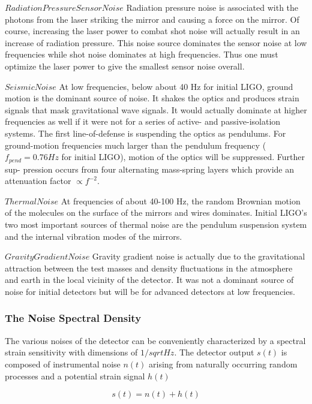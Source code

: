 \documentclass[binding=0.6cm, LaM]{sapthesis}
\begin{document}
	$Radiation Pressure Sensor Noise$
	Radiation pressure noise is associated with the photons from the laser striking the mirror 
	and causing a force on the mirror. Of course, increasing the laser power to combat shot noise 
	will actually result in an increase of radiation pressure. 
	This noise source dominates the sensor noise at low frequencies while shot noise dominates 
	at high frequencies. Thus one must optimize the laser power to give the smallest sensor noise overall.

	$Seismic Noise$
	At low frequencies, below about 40 Hz for initial LIGO, ground motion is the dominant
	source of noise. It shakes the optics and produces strain signals that mask gravitational wave
	signals. It would actually dominate at higher frequencies as well if it were not for a series
	of active- and passive-isolation systems. The first line-of-defense is suspending the optics
	as pendulums. For ground-motion frequencies much larger than the pendulum frequency
	($f_{pend} = 0.76 Hz$ for initial LIGO), motion of the optics will be suppressed. Further sup-
	pression occurs from four alternating mass-spring layers which provide an attenuation factor
	$\propto f^{-2}$.

	$Thermal Noise$
	At frequencies of about 40-100 Hz, the random Brownian motion of the molecules on the surface 
	of the mirrors and wires dominates. Initial LIGO’s two most important sources of thermal noise 
	are the pendulum suspension system and the internal vibration modes of the mirrors.

	$Gravity Gradient Noise$
	Gravity gradient noise is actually due to the gravitational attraction between the test masses 
	and density fluctuations in the atmosphere and earth in the local vicinity of the detector. 
	It was not a dominant source of noise for initial detectors but will be for advanced detectors at low frequencies.

\subsubsection{The Noise Spectral Density}

	The various noises of the detector can be conveniently characterized by a spectral strain
	sensitivity with dimensions of $1/sqrt{Hz}$.
	The detector output $s(t)$ is composed of instrumental noise $n(t)$ arising from 
	naturally occurring random processes and a potential strain signal $h(t)$

		\begin{equation}
		s(t) = n(t) + h(t)
		\end{equation}
\end{document}

